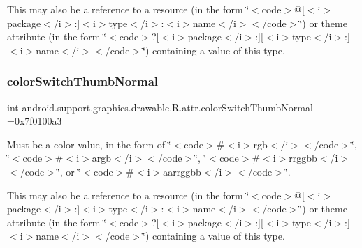 This may also be a reference to a resource (in the form \char`\"{}$<$code$>$@\mbox{[}$<$i$>$package$<$/i$>$\+:\mbox{]}$<$i$>$type$<$/i$>$\+:$<$i$>$name$<$/i$>$$<$/code$>$\char`\"{}) or theme attribute (in the form \char`\"{}$<$code$>$?\mbox{[}$<$i$>$package$<$/i$>$\+:\mbox{]}\mbox{[}$<$i$>$type$<$/i$>$\+:\mbox{]}$<$i$>$name$<$/i$>$$<$/code$>$\char`\"{}) containing a value of this type. \mbox{\label{classandroid_1_1support_1_1graphics_1_1drawable_1_1R_1_1attr_a05d6a17a9429df80cf772e49268c3f59}} 
\subsubsection{\texorpdfstring{color\+Switch\+Thumb\+Normal}{colorSwitchThumbNormal}}
{\footnotesize\ttfamily int android.\+support.\+graphics.\+drawable.\+R.\+attr.\+color\+Switch\+Thumb\+Normal =0x7f0100a3\hspace{0.3cm}{\ttfamily [static]}}

Must be a color value, in the form of \char`\"{}$<$code$>$\#$<$i$>$rgb$<$/i$>$$<$/code$>$\char`\"{}, \char`\"{}$<$code$>$\#$<$i$>$argb$<$/i$>$$<$/code$>$\char`\"{}, \char`\"{}$<$code$>$\#$<$i$>$rrggbb$<$/i$>$$<$/code$>$\char`\"{}, or \char`\"{}$<$code$>$\#$<$i$>$aarrggbb$<$/i$>$$<$/code$>$\char`\"{}. 

This may also be a reference to a resource (in the form \char`\"{}$<$code$>$@\mbox{[}$<$i$>$package$<$/i$>$\+:\mbox{]}$<$i$>$type$<$/i$>$\+:$<$i$>$name$<$/i$>$$<$/code$>$\char`\"{}) or theme attribute (in the form \char`\"{}$<$code$>$?\mbox{[}$<$i$>$package$<$/i$>$\+:\mbox{]}\mbox{[}$<$i$>$type$<$/i$>$\+:\mbox{]}$<$i$>$name$<$/i$>$$<$/code$>$\char`\"{}) containing a value of this type. \mbox{\label{classandroid_1_1support_1_1graphics_1_1drawable_1_1R_1_1attr_adb18e403a58f955940b9755ca0734e37}} 
